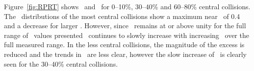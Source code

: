 Figure~\ref{fig:RPRT} shows \RTheta\ and \RP\ for 0--10\%, 30--40\% and 60--80\% central collisions.  The \RTheta\ 
distributions of the most central collisions show a maximum near \rvar\ of 0.4 and a decrease for larger \rvar.
However, since \RTheta\ remains at or above unity for the full range of \rvar\ values presented \RP\ continues
to slowly increase with increasing \rvar\ over the full measured range.  In the less central collisions,
the magnitude of the excess is reduced and the trends in \RTheta\ are less clear, however the slow increase
of \RP\ is clearly seen for the 30--40\% central collisions.




\FloatBarrier
